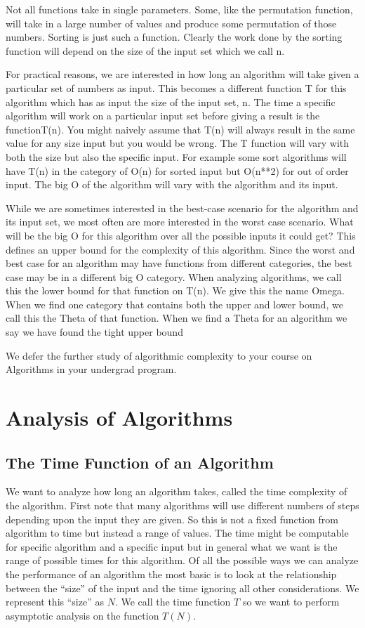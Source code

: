 \documentclass[11pt]{book} %
\theoremstyle {definition}
\theoremstyle {remark}
\begin{document}
Not all functions take in single parameters. Some, like the permutation function, will take in a large number of values and produce some permutation of those numbers. Sorting is just such a function. Clearly the work done by the sorting function will depend on the size of the input set which we call n. 

For practical reasons, we are interested in how long an algorithm will take given a particular set of numbers as input. This becomes a different function T for this algorithm which has as input the size of the input set, n. The time a specific algorithm will work on a particular input set before giving a result is the functionT(n). You might naively assume that T(n) will always result in the same value for any size input but you would be wrong. The T function will vary with both the size but also the specific input. For example some sort algorithms will have T(n) in the category of O(n) for sorted input but O(n**2) for out of order input. The big O of the algorithm will vary with the algorithm and its input.

While we are sometimes interested in the best-case scenario for the algorithm and its input set, we most often are more interested in the worst case scenario. What will be the big O for this algorithm over all the possible inputs it could get? This defines an upper bound for the complexity of this algorithm. Since the worst and best case for an algorithm may have functions from different categories, the best case may be in a different big O category. When analyzing algorithms, we call this the lower bound for that function on T(n). We give this the name Omega. When we find one category that contains both the upper and lower bound, we call this the Theta of that function. When we find a Theta for an algorithm we say we have found the tight upper bound 

We defer the further study of algorithmic complexity to your course on Algorithms in your undergrad program.


\section {Analysis of Algorithms}
  \subsection{The Time Function of an Algorithm}
  We want to analyze how long an algorithm takes, called the time complexity of the algorithm. First note that many algorithms will use different numbers of steps depending upon the input they are given. So this is not a fixed function from algorithm to time but instead a range of values. The time might be computable for specific algorithm and a specific input but in general what we want is the range of possible times for this algorithm. Of all the possible ways we can analyze the performance of an algorithm the most basic is to look at the relationship between the ``size'' of the input and the time ignoring all other considerations. We represent this ``size'' as $N$. We call the time function $T$ so we want to perform asymptotic analysis on the function $T(N)$.
\end{document}
